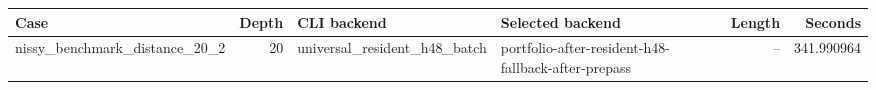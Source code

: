 {\small
\begin{tabular}{lrllrr}
\hline
Case & Depth & CLI backend & Selected backend & Length & Seconds \\
\hline
nissy\_benchmark\_distance\_20\_2 & 20 & universal\_resident\_h48\_batch & portfolio-after-resident-h48-fallback-after-prepass & -- & 341.990964 \\
\hline
\end{tabular}
}
